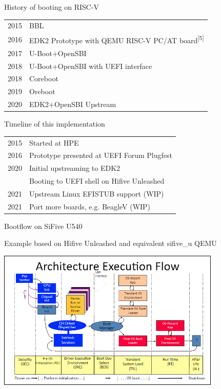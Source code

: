 \documentclass[
  10pt
]{beamer}
\begin{document}

% 

\begin{frame}{History of booting on RISC-V}
  \begin{tabular}{ll}
    2015 & BBL \\ %
    2016 & EDK2 Prototype with QEMU RISC-V PC/AT board\textsuperscript{\tiny [5]} \\
    2017 & U-Boot+OpenSBI \\
    2018 & U-Boot+OpenSBI with UEFI interface \\
    2018 & Coreboot \\
    2019 & Oreboot \\ %
    2020 & EDK2+OpenSBI Upstream \\
  \end{tabular}
\end{frame}

\begin{frame}{Timeline of this implementation}
  \begin{tabular}{ll}
    2015 & Started at HPE \\
    2016 & Prototype presented at UEFI Forum Plugfest \\
    2020 & Initial upstreaming to EDK2 \\
         & Booting to UEFI shell on Hifive Unleashed \\
    2021 & Upstream Linux EFISTUB support (WIP) \\
    2021 & Port more boards, e.g. BeagleV (WIP) \\
  \end{tabular}
\end{frame}

\begin{frame}{Bootflow on SiFive U540}
  \begin{center}
    Example based on Hifive Unleashed and equivalent sifive\_u QEMU

    \vfill

    \includegraphics[width=0.8\textwidth]{resources/bootflow.png}
  \end{center}
\end{frame}
\end{document}
